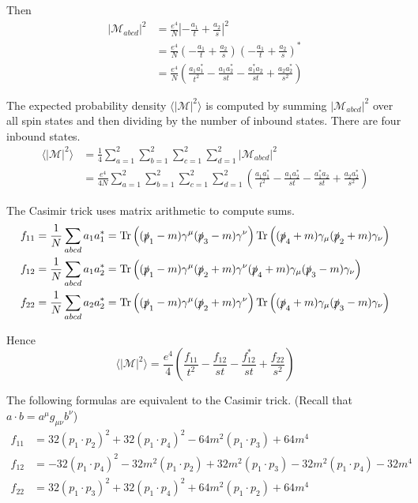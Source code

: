 \documentclass[12pt]{article}
\begin{document}
Then
\begin{align*}
|\mathcal{M}_{abcd}|^2
&=
\frac{e^4}{N}\left|{-\frac{a_1}{t}} + \frac{a_2}{s}\right|^2\\
&=
\frac{e^4}{N}\left(-\frac{a_1}{t} + \frac{a_2}{s}\right)\left(-\frac{a_1}{t} + \frac{a_2}{s}\right)^*\\
&=
\frac{e^4}{N}
\left(
\frac{a_1a_1^*}{t^2} - \frac{a_1a_2^*}{st} -
\frac{a_1^*a_2}{st} + \frac{a_2a_2^*}{s^2}
\right)
\end{align*}

The expected probability density $\langle|\mathcal{M}|^2\rangle$ is computed
by summing $|\mathcal{M}_{abcd}|^2$ over all spin states and then dividing by the number of inbound states.
There are four inbound states.
\begin{align*}
\langle|\mathcal{M}|^2\rangle
&=
\frac{1}{4}\sum_{a=1}^2\sum_{b=1}^2\sum_{c=1}^2\sum_{d=1}^2
|\mathcal{M}_{abcd}|^2\\
&=
\frac{e^4}{4N}\sum_{a=1}^2\sum_{b=1}^2\sum_{c=1}^2\sum_{d=1}^2
\left(
\frac{a_1a_1^*}{t^2} - \frac{a_1a_2^*}{st} -
\frac{a_1^*a_2}{st} + \frac{a_2a_2^*}{s^2}
\right)
\end{align*}

The Casimir trick uses matrix arithmetic to compute sums.
\begin{align*}
f_{11}&=\frac{1}{N}\sum_{abcd}a_1a_1^*=
\mathop{\rm Tr}\left(
(\slashed{p}_1-m)\gamma^\mu(\slashed{p}_3-m)\gamma^\nu
\right)
\mathop{\rm Tr}\left(
(\slashed{p}_4+m)\gamma_\mu(\slashed{p}_2+m)\gamma_\nu
\right)
\\
f_{12}&=\frac{1}{N}\sum_{abcd}a_1a_2^*=
\mathop{\rm Tr}\left(
(\slashed{p}_1-m)\gamma^\mu(\slashed{p}_2+m)\gamma^\nu
(\slashed{p}_4+m)\gamma_\mu(\slashed{p}_3-m)\gamma_\nu
\right)
\\
f_{22}&=\frac{1}{N}\sum_{abcd}a_2a_2^*=
\mathop{\rm Tr}\left(
(\slashed{p}_1-m)\gamma^\mu(\slashed{p}_2+m)\gamma^\nu
\right)
\mathop{\rm Tr}\left(
(\slashed{p}_4+m)\gamma_\mu(\slashed{p}_3-m)\gamma_\nu
\right)
\end{align*}

Hence
\begin{equation*}
\langle|\mathcal{M}|^2\rangle
=\frac{e^4}{4}
\left(
\frac{f_{11}}{t^2} - \frac{f_{12}}{st} -
\frac{f_{12}^*}{st} + \frac{f_{22}}{s^2}
\right)
\end{equation*}

The following formulas are equivalent to the Casimir trick.
(Recall that $a\cdot b=a^\mu g_{\mu\nu}b^\nu$)
\begin{align*}
f_{11}&=
32(p_1\cdot p_2)^2
+32(p_1\cdot p_4)^2
-64 m^2(p_1\cdot p_3)
+64 m^4
\\
f_{12}&=
-32 (p_1\cdot p_4)^2
-32 m^2 (p_1\cdot p_2)
+32 m^2 (p_1\cdot p_3)
-32 m^2 (p_1\cdot p_4)
-32 m^4
\\
f_{22}&=
32(p_1\cdot p_3)^2
+32(p_1\cdot p_4)^2
+64 m^2(p_1\cdot p_2)
+64 m^4
\end{align*}
\end{document}
